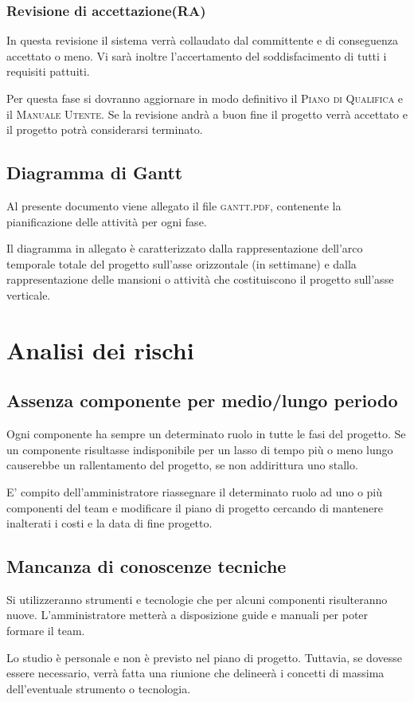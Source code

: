 \documentclass[11pt,a4paper]{article}
\begin{document}
\subsubsection{Revisione di accettazione(RA)}
In questa revisione il sistema verrà collaudato dal committente e di conseguenza accettato o meno.
Vi sarà inoltre l'accertamento del soddisfacimento di tutti i requisiti pattuiti.

Per questa fase si dovranno aggiornare in modo definitivo il \textsc{Piano di Qualifica} e il \textsc{Manuale Utente}.
Se la revisione andrà a buon fine il progetto verrà accettato e il progetto potrà considerarsi terminato.
\subsection{Diagramma di Gantt}
Al presente documento viene allegato il file \textsc{gantt.pdf}, contenente la pianificazione delle attività per ogni fase.

Il diagramma in allegato è caratterizzato dalla rappresentazione dell'arco temporale totale del progetto sull'asse orizzontale (in settimane) e dalla rappresentazione delle mansioni o attività che costituiscono il progetto sull'asse verticale.

\section{Analisi dei rischi}
\subsection{Assenza componente per medio/lungo periodo}
Ogni componente ha sempre un determinato ruolo in tutte le fasi del progetto.
Se un componente risultasse indisponibile per un lasso di tempo più o meno lungo causerebbe un rallentamento del progetto, se non addirittura uno stallo.

E' compito dell'amministratore riassegnare il determinato ruolo ad uno o più componenti del team e modificare il piano di progetto cercando di mantenere inalterati i costi e la data di fine progetto.
\subsection{Mancanza di conoscenze tecniche}
Si utilizzeranno strumenti e tecnologie che per alcuni componenti risulteranno nuove.
L'amministratore metterà a disposizione guide e manuali per poter formare il team.

Lo studio è personale e non è previsto nel piano di progetto.
Tuttavia, se dovesse essere necessario, verrà fatta una riunione che delineerà i concetti di massima dell'eventuale strumento o tecnologia.
\end{document}
